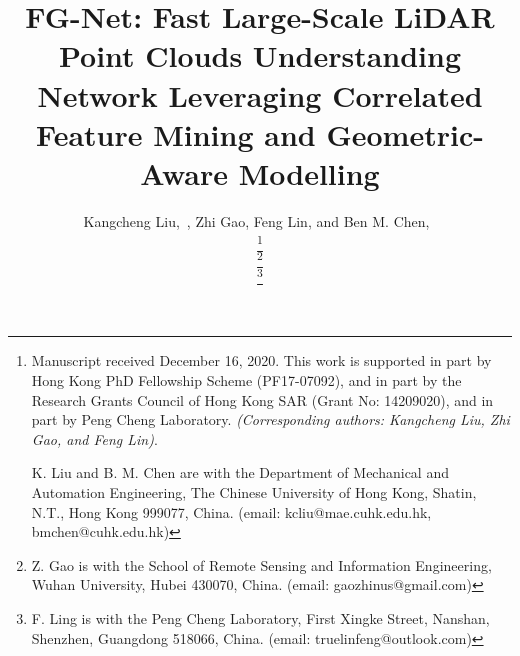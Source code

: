 \documentclass[journal]{IEEEtran}
\begin{document}
\title{FG-Net: Fast Large-Scale LiDAR Point Clouds Understanding Network Leveraging Correlated Feature Mining and Geometric-Aware Modelling}



\author{Kangcheng Liu,~, Zhi Gao, Feng Lin, and Ben M. Chen,~
        
\thanks{Manuscript received December 16, 2020. This work is supported in part by Hong Kong PhD Fellowship Scheme (PF17-07092), and in part by the Research Grants Council of Hong Kong SAR (Grant No: 14209020), and in part by Peng Cheng Laboratory. \textit{(Corresponding authors: Kangcheng Liu, Zhi Gao, and Feng Lin)}. 

K. Liu and B. M. Chen are with the Department of Mechanical and Automation Engineering, The Chinese University of Hong Kong, Shatin, N.T.,  Hong Kong 999077, China.
(email: kcliu@mae.cuhk.edu.hk, bmchen@cuhk.edu.hk)}



\thanks{Z. Gao is with the School of Remote Sensing and Information Engineering, Wuhan University, Hubei 430070, China.
(email: gaozhinus@gmail.com)}


\thanks{F. Ling is with the Peng Cheng Laboratory, First Xingke Street, Nanshan, Shenzhen, Guangdong 518066, China.
(email: truelinfeng@outlook.com)}
}   

        






















\maketitle
\end{document}
